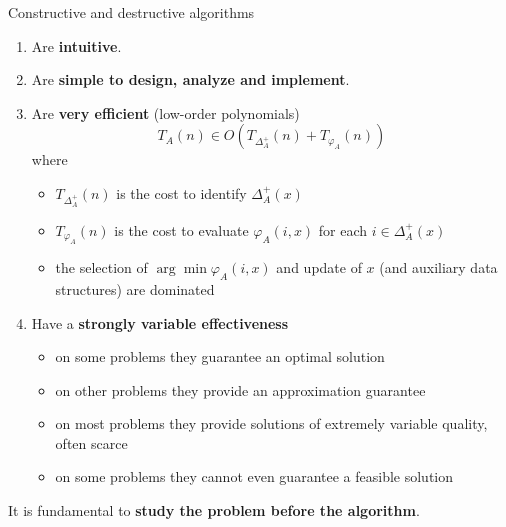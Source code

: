 \documentclass[11pt]{article}
\begin{document}
	Constructive and destructive algorithms
	\begin{enumerate}
		\item Are \textbf{intuitive}.\\
		
		\item Are \textbf{simple to design, analyze and implement}.\\
		
		\item Are \textbf{very efficient} (low-order polynomials)
		$$ T_A (n) \in O \left(T_{\Delta_A^+} (n) + T_{\varphi_A} (n) \right) $$
		where
		\begin{itemize}
			\item $T_{\Delta_A^+} (n)$ is the cost to identify $\Delta_A^+ (x)$
			
			\item $T_{\varphi_A} (n)$ is the cost to evaluate $\varphi_A (i,x)$ for each $i \in \Delta_A^+ (x)$
			
			\item the selection of $\arg \min \varphi_A (i, x)$ and update of $x$ (and auxiliary data structures) are dominated
		\end{itemize}
		\nn
		
		\item Have a \textbf{strongly variable effectiveness}
		\begin{itemize}
			\item on some problems they guarantee an optimal solution
			\item on other problems they provide an approximation guarantee
			\item on most problems they provide solutions of extremely variable quality, often scarce
			\item on some problems they cannot even guarantee a feasible solution
		\end{itemize}
		\nn
	\end{enumerate}
	
	It is fundamental to \textbf{study the problem before the algorithm}.\\
	
\end{document}
